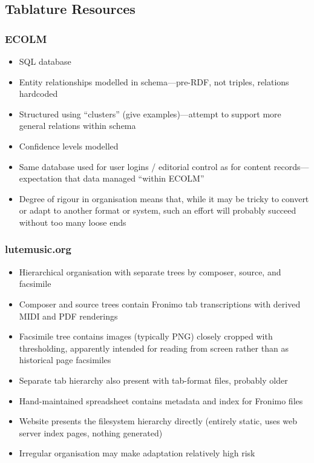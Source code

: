 \documentclass[twocolumn,10pt]{paper}
\begin{document}
\begin{sloppypar}
  \subsection{Tablature Resources}
  
  \subsubsection{ECOLM}

  \begin{itemize}
  \item SQL database
  \item Entity relationships modelled in schema---pre-RDF, not
    triples, relations hardcoded
  \item Structured using ``clusters'' (give examples)---attempt to
    support more general relations within schema
  \item Confidence levels modelled
  \item Same database used for user logins / editorial control as for
    content records---expectation that data managed ``within ECOLM''
  \item Degree of rigour in organisation means that, while it may be
    tricky to convert or adapt to another format or system, such an
    effort will probably succeed without too many loose ends
  \end{itemize}
  
  \subsubsection{lutemusic.org}

  \begin{itemize}
  \item Hierarchical organisation with separate trees by composer,
    source, and facsimile
  \item Composer and source trees contain Fronimo tab transcriptions
    with derived MIDI and PDF renderings
  \item Facsimile tree contains images (typically PNG) closely cropped
    with thresholding, apparently intended for reading from screen
    rather than as historical page facsimiles
  \item Separate tab hierarchy also present with tab-format files,
    probably older
  \item Hand-maintained spreadsheet contains metadata and index for
    Fronimo files
  \item Website presents the filesystem hierarchy directly (entirely
    static, uses web server index pages, nothing generated)
  \item Irregular organisation may make adaptation relatively high
    risk
  \end{itemize}


\end{sloppypar}
\end{document}
